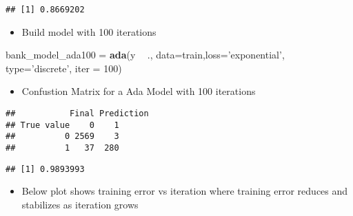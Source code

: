 \documentclass[
]{article}
\newenvironment{Shaded}{\begin{snugshade}}{\end{snugshade}}
\newcommand{\DataTypeTok}[1]{\textcolor[rgb]{0.13,0.29,0.53}{#1}}
\newcommand{\DecValTok}[1]{\textcolor[rgb]{0.00,0.00,0.81}{#1}}
\newcommand{\KeywordTok}[1]{\textcolor[rgb]{0.13,0.29,0.53}{\textbf{#1}}}
\newcommand{\NormalTok}[1]{#1}
\newcommand{\OperatorTok}[1]{\textcolor[rgb]{0.81,0.36,0.00}{\textbf{#1}}}
\newcommand{\StringTok}[1]{\textcolor[rgb]{0.31,0.60,0.02}{#1}}
\providecommand{\tightlist}{%
  \setlength{\itemsep}{0pt}\setlength{\parskip}{0pt}}
\begin{document}
\begin{verbatim}
## [1] 0.8669202
\end{verbatim}

\begin{itemize}
\tightlist
\item
  Build model with 100 iterations
\end{itemize}

\begin{Shaded}
\begin{Highlighting}[]
\NormalTok{bank_model_ada100 =}\StringTok{ }\KeywordTok{ada}\NormalTok{(y }\OperatorTok{~}\StringTok{ }\NormalTok{., }\DataTypeTok{data=}\NormalTok{train,}\DataTypeTok{loss=}\StringTok{'exponential'}\NormalTok{, }\DataTypeTok{type=}\StringTok{'discrete'}\NormalTok{, }\DataTypeTok{iter =} \DecValTok{100}\NormalTok{)}
\end{Highlighting}
\end{Shaded}

\begin{itemize}
\tightlist
\item
  Confustion Matrix for a Ada Model with 100 iterations
\end{itemize}

\begin{Shaded}
\end{Shaded}

\begin{verbatim}
##           Final Prediction
## True value    0    1
##          0 2569    3
##          1   37  280
\end{verbatim}

\begin{Shaded}
\end{Shaded}

\begin{verbatim}
## [1] 0.9893993
\end{verbatim}

\begin{itemize}
\tightlist
\item
  Below plot shows training error vs iteration where training error
  reduces and stabilizes as iteration grows
\end{itemize}
\end{document}
